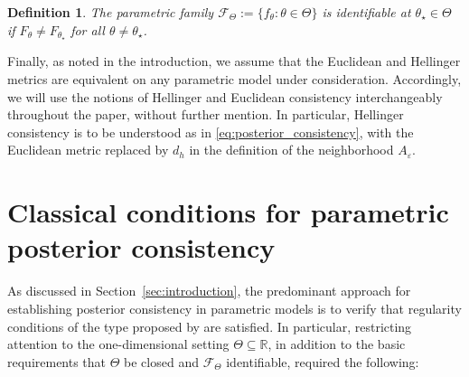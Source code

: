 \documentclass[11pt,twoside]{article}
\newtheorem{definition}{Definition}
\def\RR{\mathbb{R}}
\begin{document}
\begin{definition}\label{def:identifiability}
    The parametric family \(\mathcal F_\Theta := \{f_\theta : \theta \in \Theta\}\) is identifiable at \(\theta_\star \in \Theta\) if \(F_\theta \neq F_{\theta_\star}\) for all \(\theta \neq \theta_\star\).
\end{definition}

Finally, as noted in the introduction, we assume that the Euclidean and Hellinger metrics are equivalent on any parametric model under consideration. Accordingly, we will use the notions of Hellinger and Euclidean consistency interchangeably throughout the paper, without further mention. In particular, Hellinger consistency is to be understood as in \eqref{eq:posterior_consistency}, with the Euclidean metric replaced by $d_h$ in the definition of the neighborhood $A_\varepsilon$.





\section{Classical conditions for parametric posterior consistency}\label{sec:classical_conditions}

As discussed in Section~\ref{sec:introduction}, the predominant approach for establishing posterior consistency in parametric models is to verify that regularity conditions of the type proposed by \cite{walker1969} are satisfied. In particular, restricting attention to the one-dimensional setting \(\Theta \subseteq \RR\), in addition to the basic requirements that \(\Theta\) be closed and \(\mathcal F_\Theta\) identifiable, \cite{walker1969} required the following:
\end{document}
